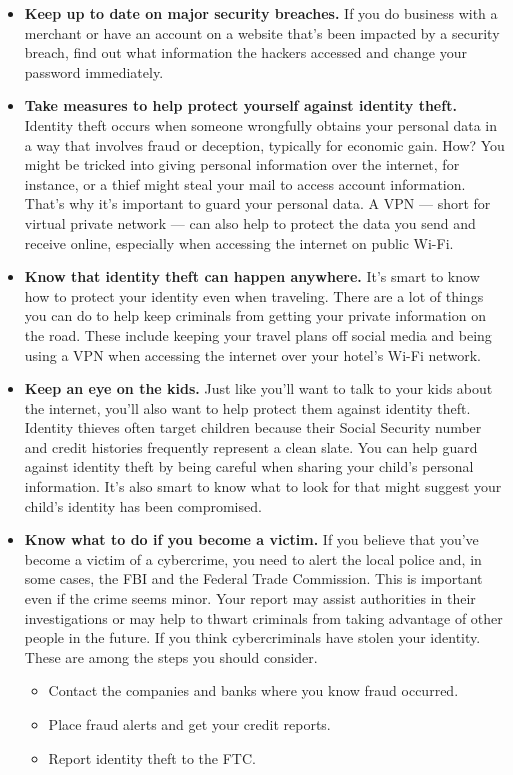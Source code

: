 \documentclass [12pt, a4paper]{article}
\begin{document}
\begin{itemize}
\item \textbf{Keep up to date on major security breaches.} If you do business with a merchant or have an account on a website that’s been impacted by a security breach, find out what information the hackers accessed and change your password immediately.

\item \textbf{Take measures to help protect yourself against identity theft.} Identity theft occurs when someone wrongfully obtains your personal data in a way that involves fraud or deception, typically for economic gain. How? You might be tricked into giving personal information over the internet, for instance, or a thief might steal your mail to access account information. That’s why it’s important to guard your personal data. A VPN — short for virtual private network — can also help to protect the data you send and receive online, especially when accessing the internet on public Wi-Fi.

\item \textbf{Know that identity theft can happen anywhere.} It’s smart to know how to protect your identity even when traveling. There are a lot of things you can do to help keep criminals from getting your private information on the road. These include keeping your travel plans off social media and being using a VPN when accessing the internet over your hotel’s Wi-Fi network.

\item \textbf{Keep an eye on the kids.} Just like you’ll want to talk to your kids about the internet, you’ll also want to help protect them against identity theft. Identity thieves often target children because their Social Security number and credit histories frequently represent a clean slate. You can help guard against identity theft by being careful when sharing your child’s personal information. It’s also smart to know what to look for that might suggest your child’s identity has been compromised.

\item \textbf{Know what to do if you become a victim.} If you believe that you’ve become a victim of a cybercrime, you need to alert the local police and, in some cases, the FBI and the Federal Trade Commission. This is important even if the crime seems minor. Your report may assist authorities in their investigations or may help to thwart criminals from taking advantage of other people in the future. If you think cybercriminals have stolen your identity. These are among the steps you should consider.

\begin{itemize}
	\item Contact the companies and banks where you know fraud occurred.
	\item Place fraud alerts and get your credit reports.
	\item Report identity theft to the FTC.
\end{itemize}

\end{itemize}
\end{document}
